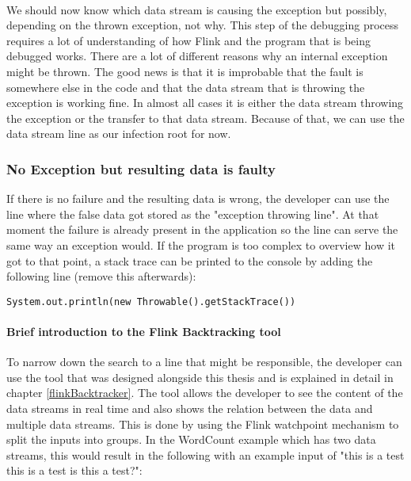 \paragraph{} We should now know which data stream is causing the exception but possibly, depending on the thrown exception, not why. This step of the debugging process requires a lot of understanding of how Flink and the program that is being debugged works. There are a lot of different reasons why an internal exception might be thrown. The good news is that it is improbable that the fault is somewhere else in the code and that the data stream that is throwing the exception is working fine. In almost all cases it is either the data stream throwing the exception or the transfer to that data stream. Because of that, we can use the data stream line as our infection root for now.

\subsubsection{No Exception but resulting data is faulty}
If there is no failure and the resulting data is wrong, the developer can use the line where the false data got stored as the "exception throwing line". At that moment the failure is already present in the application so the line can serve the same way an exception would. If the program is too complex to overview how it got to that point, a stack trace can be printed to the console by adding the following line (remove this afterwards):
\begin{lstlisting}[caption={Create Stacktrace}]
 System.out.println(new Throwable().getStackTrace())
\end{lstlisting}

\paragraph{Brief introduction to the Flink Backtracking tool}
\label{mdfBriefIntroTool}

To narrow down the search to a line that might be responsible, the developer can use the tool that was designed alongside this thesis and is explained in detail in chapter \ref{flinkBacktracker}. The tool allows the developer to see the content of the data streams in real time and also shows the relation between the data and multiple data streams. This is done by using the Flink watchpoint mechanism to split the inputs into groups. In the WordCount example which has two data streams, this would result in the following with an example input of "this is a test this is a test is this a test?":


